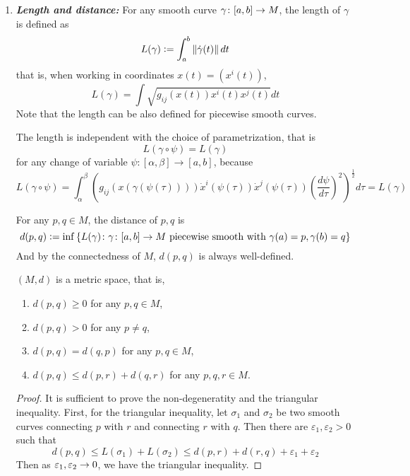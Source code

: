 \begin{enumerate}[label=\arabic{*}.]
	\item {\emph{\textbf{Length and distance:}}} For any smooth curve $\gamma \colon [a,b] \rightarrow M$, the length of $\gamma$ is defined as
	\begin{equation*}
		L(\gamma) \vcentcolon= \int_a^b \left\lVert\dot{\gamma}(t)\right\lVert dt
	\end{equation*}
	that is, when working in coordinates $x(t) = (x^i(t))$,
	\begin{equation*}
		L(\gamma) = \int \sqrt{g_{ij}(x(t))x^i(t)x^j(t)}dt
	\end{equation*}
	Note that the length can be also defined for piecewise smooth curves.
	\begin{rmk}
		The length is independent with the choice of parametrization, that is
		\begin{equation*}
			L(\gamma \circ \psi)=L(\gamma)
		\end{equation*}
		for any change of variable $\psi:[\alpha, \beta] \rightarrow[a, b]$, because
		\begin{equation*}
			L(\gamma \circ \psi)=\int_\alpha^\beta\left(g_{i j}(x(\gamma(\psi(\tau)))) \dot{x}^i(\psi(\tau)) \dot{x}^j(\psi(\tau))\left(\frac{d \psi}{d \tau}\right)^2\right)^{\frac{1}{2}} d \tau = L(\gamma)
		\end{equation*}
	\end{rmk}

	\noindent For any $p,q \in M$, the distance of $p,q$ is
	\begin{equation*}
		d(p,q) \vcentcolon= \inf\left\{L(\gamma) \colon \gamma \colon [a,b] \rightarrow M \text{ piecewise smooth with }\gamma(a)=p,\gamma(b)=q\right\}
	\end{equation*}
	And by the connectedness of $M$, $d(p,q)$ is always well-defined.
	\begin{lem}\label{lem:distancedef}
		$(M,d)$ is a metric space, that is,
		\begin{enumerate}[label=(\roman*)]
			\item $d(p,q) \geq 0$ for any $p,q \in M$,
			\item $d(p,q) > 0$ for any $p \neq q$, 
			\item $d(p,q) = d(q,p)$ for any $p,q \in M$,
			\item $d(p,q) \leq d(p,r) + d(q,r)$ for any $p,q,r \in M$.
		\end{enumerate}
	\end{lem}
	\begin{proof}
		It is sufficient to prove the non-degeneratity and the triangular inequality. First, for the triangular inequality, let $\sigma_1$ and $\sigma_2$ be two smooth curves connecting $p$ with $r$ and connecting $r$ with $q$. Then there are $\varepsilon_1,\varepsilon_2 > 0$ such that
		\begin{equation*}
			d(p,q) \leq L(\sigma_1)+L(\sigma_2) \leq d(p,r)+d(r,q)+\varepsilon_1 + \varepsilon_2
		\end{equation*}
		Then as $\varepsilon_1,\varepsilon_2 \rightarrow 0$, we have the triangular inequality.


\end{proof}
\end{enumerate}
